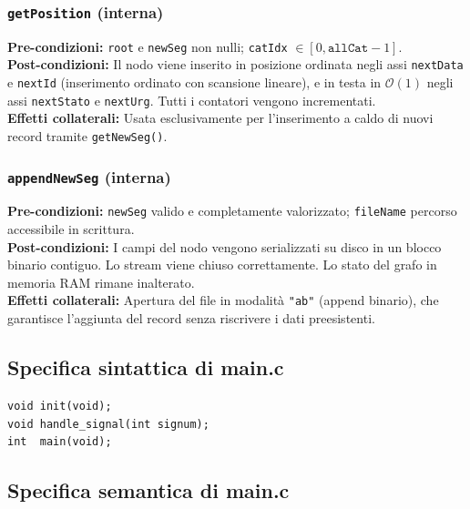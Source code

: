 \documentclass[12pt, a4paper]{article}
\begin{document}
\subsubsection{\texttt{getPosition} (interna)}
\vspace{3mm}
\begin{specbox}
\textbf{Pre-condizioni:} \texttt{root} e \texttt{newSeg} non nulli; \texttt{catIdx} $\in [0, \texttt{allCat}-1]$. \\
\textbf{Post-condizioni:} Il nodo viene inserito in posizione ordinata negli assi \texttt{nextData} e \texttt{nextId} (inserimento ordinato con scansione lineare), e in testa in $\mathcal{O}(1)$ negli assi \texttt{nextStato} e \texttt{nextUrg}. Tutti i contatori vengono incrementati. \\
\textbf{Effetti collaterali:} Usata esclusivamente per l'inserimento a caldo di nuovi record tramite \texttt{getNewSeg()}.
\end{specbox}

\subsubsection{\texttt{appendNewSeg} (interna)}
\vspace{3mm}
\begin{specbox}
\textbf{Pre-condizioni:} \texttt{newSeg} valido e completamente valorizzato; \texttt{fileName} percorso accessibile in scrittura. \\
\textbf{Post-condizioni:} I campi del nodo vengono serializzati su disco in un blocco binario contiguo. Lo stream viene chiuso correttamente. Lo stato del grafo in memoria RAM rimane inalterato. \\
\textbf{Effetti collaterali:} Apertura del file in modalità \texttt{"ab"} (append binario), che garantisce l'aggiunta del record senza riscrivere i dati preesistenti.
\end{specbox}

\newpage

\subsection{Specifica sintattica di main.c}
\begin{lstlisting}[style=cstyle, numbers=none]
void init(void);
void handle_signal(int signum);
int  main(void);
\end{lstlisting}

\subsection{Specifica semantica di main.c}
\end{document}
